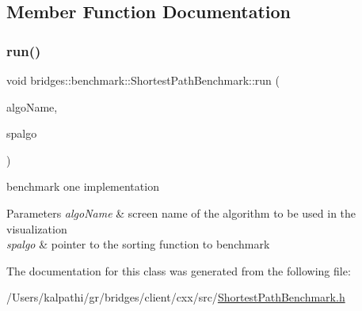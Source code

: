 \subsection{Member Function Documentation}
\mbox{\label{classbridges_1_1benchmark_1_1_shortest_path_benchmark_a012285a17bb34b443265a9962ef4d3c2}} 
\subsubsection{\texorpdfstring{run()}{run()}}
{\footnotesize\ttfamily void bridges\+::benchmark\+::\+Shortest\+Path\+Benchmark\+::run (\begin{DoxyParamCaption}\item[{std\+::string}]{algo\+Name,  }\item[{void($\ast$)(const \mbox{\hyperlink{classbridges_1_1datastructure_1_1_graph_adj_list}{Graph\+Adj\+List}}$<$ int, \mbox{\hyperlink{classbridges_1_1dataset_1_1_o_s_m_vertex}{O\+S\+M\+Vertex}}, double $>$ \&gr, int source, std\+::unordered\+\_\+map$<$ int, double $>$ \&distance, std\+::unordered\+\_\+map$<$ int, int $>$ \&parent)}]{spalgo }\end{DoxyParamCaption})\hspace{0.3cm}{\ttfamily [inline]}}



benchmark one implementation 


\begin{DoxyParams}{Parameters}
{\em algo\+Name} & screen name of the algorithm to be used in the visualization \\
\hline
{\em spalgo} & pointer to the sorting function to benchmark \\
\hline
\end{DoxyParams}


The documentation for this class was generated from the following file\+:\begin{DoxyCompactItemize}
\item 
/\+Users/kalpathi/gr/bridges/client/cxx/src/\mbox{\hyperlink{_shortest_path_benchmark_8h}{Shortest\+Path\+Benchmark.\+h}}\end{DoxyCompactItemize}
